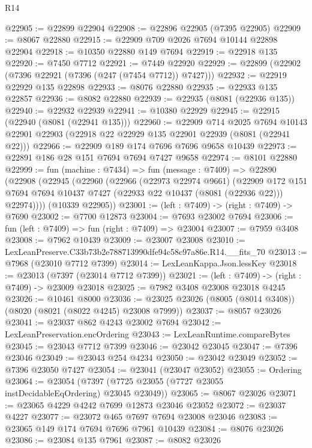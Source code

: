 \begin{lexlean}{R14}
\begin{coremodule}
@22905 := @22899 @22904
@22908 := @22896 @22905 (@7395 @22905)
@22909 := @8067 @22880
@22915 := @22909 @709 @2026 @7694 @10144 @22898 @22904
@22918 := @10350 @22880 @149 @7694
@22919 := @22918 @135
@22920 := @7450 @7712
@22921 := @7449 @22920
@22929 := @22899 (@22902 (@7396 @22921 (@7396 (@247 (@7454 @7712)) @7427)))
@22932 := @22919 @22929 @135 @22898
@22933 := @8076 @22880
@22935 := @22933 @135 @22857
@22936 := @8082 @22880
@22939 := @22935 (@8081 (@22936 @135))
@22940 := @22932 @22939
@22941 := @10380 @22929
@22945 := @22915 (@22940 (@8081 (@22941 @135)))
@22960 := @22909
    @714
    @2025
    @7694
    @10143
    @22901
    @22903
    (@22918 @22 @22929 @135 @22901 @22939 (@8081 (@22941 @22)))
@22966 := @22909 @189 @174 @7696 @7696 @9658 @10439
@22973 := @22891 @186 @28 @151 @7694 @7694 @7427 @9658
@22974 := @8101 @22880
@22999 := fun (machine : @7434) =>
  fun (message : @7409) =>
  @22890
    (@22908
      (@22945
        (@22960
          (@22966
            (@22973 @22974 @9661)
            (@22909
              @172
              @151
              @7694
              @7694
              @10437
              @7427
              (@22933 @22 @10437 (@8081 (@22936 @22)))
              @22974))))
      (@10339 @22905))
@23001 := (left : @7409) -> (right : @7409) -> @7690
@23002 := @7700 @12873
@23004 := @7693 @23002 @7694
@23006 := fun (left : @7409) => fun (right : @7409) => @23004
@23007 := @7959 @3408
@23008 := @7962 @10439
@23009 := @23007 @23008
@23010 := LexLeanPreserve.C33b73b2e788713990dfe94c58c97a86e.R14.__fits_70
@23013 := @7968 (@23010 @7712 @7399)
@23014 := LexLeanKappa.Json.lessKey
@23018 := @23013 (@7397 (@23014 @7712 @7399))
@23021 := (left : @7409) -> (right : @7409) -> @23009 @23018
@23025 := @7982 @3408 @23008 @23018 @4245
@23026 := @10461 @8000
@23036 := @23025 @23026 (@8005 (@8014 @3408)) (@8020 (@8021 (@8022 @4245) @23008 @7999))
@23037 := @8057 @23026
@23041 := @23037 @862 @4243 @23002 @7694
@23042 := LexLeanPreservation.encOrdering
@23043 := LexLeanRuntime.compareBytes
@23045 := @23043 @7712 @7399
@23046 := @23042 @23045
@23047 := @7396 @23046
@23049 := @23043 @254 @4234
@23050 := @23042 @23049
@23052 := @7396 @23050 @7427
@23054 := @23041 (@23047 @23052)
@23055 := Ordering
@23064 := @23054 (@7397 (@7725 @23055 (@7727 @23055 instDecidableEqOrdering) @23045 @23049))
@23065 := @8067 @23026
@23071 := @23065 @4229 @4242 @7699 @12873 @23046 @23052
@23072 := @23037 @4227
@23077 := @23072 @465 @7697 @7694 @23008 @23046
@23083 := @23065 @149 @174 @7694 @7696 @7961 @10439
@23084 := @8076 @23026
@23086 := @23084 @135 @7961
@23087 := @8082 @23026

\end{coremodule}
\end{lexlean}

